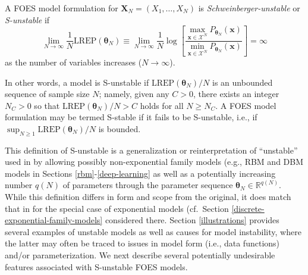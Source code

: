 \documentclass[numbib]{imamat}
\theoremstyle{theorem}
\theoremstyle{lemma}
\theoremstyle{example}
\theoremstyle{corollary}
\theoremstyle{definition}
\theoremstyle{remark}
\theoremstyle{approximation}
\theoremstyle{scheme}
\newcommand{\REP}{\mathrm{LREP}}
\let\BeginKnitrBlock\begin \let\EndKnitrBlock\end
\begin{document}
\BeginKnitrBlock{definition}[S-unstable FOES model]
\protect\hypertarget{def:instabFSFS}{}{\label{def:instabFSFS}
\iffalse (S-unstable FOES model) \fi{} }A FOES model formulation for
\(\boldsymbol X_N=(X_1,\ldots,X_N)\) is \emph{Schweinberger-unstable} or
\emph{S-unstable} if \begin{equation}
\label{eq:Sun}
\lim \limits_{N \rightarrow \infty} \frac{1}{N} \REP(\boldsymbol \theta_N) \equiv \lim \limits_{N \rightarrow \infty} \frac{1}{N}\log \left[\frac{\max\limits_{  \boldsymbol x\in \mathcal{X}^N}P_{\boldsymbol \theta_N}( \boldsymbol x)}{\min\limits_{ \boldsymbol x \in \mathcal{X}^N}P_{\boldsymbol \theta_N}( \boldsymbol x)}\right] = \infty
\end{equation} as the number of variables increases
(\(N \rightarrow \infty\)).
\EndKnitrBlock{definition}

In other words, a model is S-unstable if
\(\REP(\boldsymbol \theta_N)/N\) is an unbounded sequence of sample size
\(N\); namely, given any \(C > 0\), there exists an integer \(N_C > 0\)
so that \(\REP(\boldsymbol \theta_N)/N > C\) holds for all
\(N \ge N_C\). A FOES model formulation may be termed S-stable if it
fails to be S-unstable, i.e., if
\(\sup_{N \geq 1}\REP(\boldsymbol \theta_N)/N\) is bounded.

This definition of S-unstable is a generalization or reinterpretation of
``unstable'' used in \citet{schweinberger2011instability} by allowing
possibly non-exponential family models (e.g., RBM and DBM models in
Sections \ref{rbm}-\ref{deep-learning} as well as a potentially
increasing number \(q(N)\) of parameters through the parameter sequence
\(\boldsymbol \theta_N\in \mathbb{R}^{q(N)}\). While this definition
differs in form and scope from the original, it does match that in
\citet{schweinberger2011instability} for the special case of exponential
models (cf.~Section \ref{discrete-exponential-family-models} considered
there. Section \ref{illustrations} provides several examples of unstable
models as well as causes for model instability, where the latter may
often be traced to issues in model form (i.e., data functions) and/or
parameterization. We next describe several potentially undesirable
features associated with S-unstable FOES models.
\end{document}
